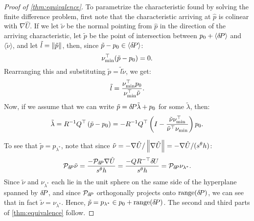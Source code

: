 \documentclass[sisc-eikonal.tex]{subfiles}
\begin{document}
\begin{proof}[Proof of \cref{thm:equivalence}]
  To parametrize the characteristic found by solving the finite
  difference problem, first note that the characteristic arriving at
  $\hat{p}$ is colinear with $\nabla \hat{U}$. If we let $\tilde{\nu}$
  be the normal pointing from $\hat{p}$ in the direction of the
  arriving characteristic, let $\tilde{p}$ be the point of
  intersection between $p_0 + \langle {\delta \hspace{-0.14em} P} \rangle$ and
  $\langle \tilde{\nu} \rangle$, and let
  $\tilde{l} = \left\|\tilde{p}\right\|$, then, since
  $\tilde{p} - p_0 \in \langle {\delta \hspace{-0.14em} P} \rangle$:
  \begin{equation}
    \nu_{\operatorname{min}}^\top (\tilde{p} - p_0) = 0.
  \end{equation}
  Rearranging this and substituting
  $\tilde{p} = \tilde{l} \tilde{\nu}$, we get:
  \begin{equation}
    \tilde{l} = \frac{\nu_{\operatorname{min}}^\top p_0}{\nu_{\operatorname{min}}^\top \tilde{\nu}}.
  \end{equation}
  Now, if we assume that we can write
  $\tilde{p} = {\delta \hspace{-0.14em} P} \tilde{\lambda} + p_0$ for some
  $\tilde{\lambda}$, then:
  \begin{equation}
    \tilde{\lambda} = R^{-1} Q^\top \left(\tilde{p} - p_0\right) = -R^{-1} Q^\top \left(I - \frac{\tilde{\nu} \nu_{\operatorname{min}}^\top}{\tilde{\nu}^\top \nu_{\operatorname{min}}}\right) p_0.
  \end{equation}

  To see that $\tilde{p} = p_{\lambda^*}$, note that since
  $\tilde{\nu} = -\nabla \hat{U}/\left\|\nabla \hat{U}\right\| = -\nabla
  \hat{U}/(s^\theta h)$:
  \begin{equation}
    \mathcal{P}_{{\delta \hspace{-0.14em} P}} \tilde{\nu} = \frac{-\mathcal{P}_{{\delta \hspace{-0.14em} P}} \nabla \hat{U}}{s^\theta h} = \frac{-QR^{-\top} {\delta \hspace{-0.09em} U}}{s^\theta h} = \mathcal{P}_{{\delta \hspace{-0.14em} P}} \nu_{\lambda^*}.
  \end{equation}
  Since $\tilde{\nu}$ and $\nu_{\lambda^*}$ each lie in the unit
  sphere on the same side of the hyperplane spanned by ${\delta \hspace{-0.14em} P}$, and
  since $\mathcal{P}_{{\delta \hspace{-0.14em} P}}$ orthogonally projects onto
  $\operatorname{range}({\delta \hspace{-0.14em} P})$, we can see that in fact
  $\tilde{\nu} = \nu_{\lambda^*}$. Hence,
  $\tilde{p} = p_{\lambda^*} \in p_0 + \operatorname{range}({\delta \hspace{-0.14em} P})$. The second
  and third parts of \cref{thm:equivalence} follow.
\end{proof}
\end{document}
